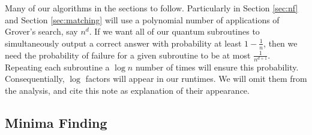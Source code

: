 \begin{note}\label{note:log}
Many of our algorithms in the sections to follow. Particularly in Section \ref{sec:nf} and Section \ref{sec:matching} will use a polynomial number of applications of Grover's search, say $n^d$. If we want all of our quantum subroutines to simultaneously output a correct answer with probability at least $1-\frac{1}{n}$, then we need the probability of failure for a given subroutine to be at most $\frac{1}{n^{d+1}}$. Repeating each subroutine a $\log n$ number of times will ensure this probability. Consequentially, $\log $ factors will appear in our runtimes. We will omit them from the analysis, and cite this note as explanation of their appearance.
\end{note}
\subsection{Minima Finding}